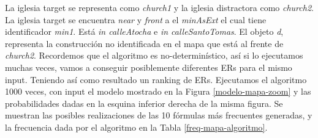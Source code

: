 La iglesia target se representa como {\it church1} y la iglesia distractora como {\it church2}. La iglesia target se encuentra {\it near} y {\it front} a el {\it minAsExt} el cual tiene identificador {\it min1}. Est\'a {\it in calleAtocha} e {\it in calleSantoTomas}. El objeto {\it d}, representa la construcci\'on no identificada en el mapa que est\'a al frente de {\it church2}.
Recordemos que el algoritmo es no-determin\'istico, as\'i si lo ejecutamos muchas veces, vamos a conseguir posiblemente diferentes ERs para el mismo input. Teniendo as\'i como resultado un ranking de ERs.
Ejecutamos el algoritmo 1000 veces, con input el modelo mostrado en la Figura \ref{modelo-mapa-zoom} y las probabilidades dadas en la esquina inferior derecha de la misma figura. Se muestran las posibles realizaciones de las 10 f\'ormulas m\'as frecuentes generadas, y la frecuencia dada por el algoritmo en la Tabla \ref{freq-mapa-algoritmo}. 










